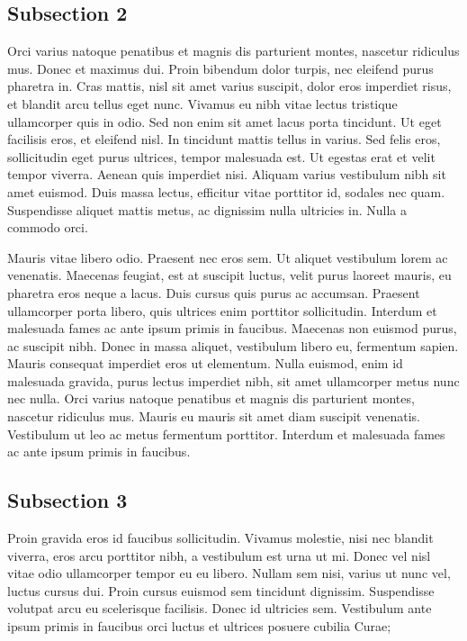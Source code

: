 \subsection{Subsection 2}

Orci varius natoque penatibus et magnis dis parturient montes, nascetur ridiculus mus. Donec et maximus dui. Proin bibendum dolor turpis, nec eleifend purus pharetra in. Cras mattis, nisl sit amet varius suscipit, dolor eros imperdiet risus, et blandit arcu tellus eget nunc. Vivamus eu nibh vitae lectus tristique ullamcorper quis in odio. Sed non enim sit amet lacus porta tincidunt. Ut eget facilisis eros, et eleifend nisl. In tincidunt mattis tellus in varius. Sed felis eros, sollicitudin eget purus ultrices, tempor malesuada est. Ut egestas erat et velit tempor viverra. Aenean quis imperdiet nisi. Aliquam varius vestibulum nibh sit amet euismod. Duis massa lectus, efficitur vitae porttitor id, sodales nec quam. Suspendisse aliquet mattis metus, ac dignissim nulla ultricies in. Nulla a commodo orci.

Mauris vitae libero odio. Praesent nec eros sem. Ut aliquet vestibulum lorem ac venenatis. Maecenas feugiat, est at suscipit luctus, velit purus laoreet mauris, eu pharetra eros neque a lacus. Duis cursus quis purus ac accumsan. Praesent ullamcorper porta libero, quis ultrices enim porttitor sollicitudin. Interdum et malesuada fames ac ante ipsum primis in faucibus. Maecenas non euismod purus, ac suscipit nibh. Donec in massa aliquet, vestibulum libero eu, fermentum sapien. Mauris consequat imperdiet eros ut elementum. Nulla euismod, enim id malesuada gravida, purus lectus imperdiet nibh, sit amet ullamcorper metus nunc nec nulla. Orci varius natoque penatibus et magnis dis parturient montes, nascetur ridiculus mus. Mauris eu mauris sit amet diam suscipit venenatis. Vestibulum ut leo ac metus fermentum porttitor. Interdum et malesuada fames ac ante ipsum primis in faucibus.

\subsection{Subsection 3}

Proin gravida eros id faucibus sollicitudin. Vivamus molestie, nisi nec blandit viverra, eros arcu porttitor nibh, a vestibulum est urna ut mi. Donec vel nisl vitae odio ullamcorper tempor eu eu libero. Nullam sem nisi, varius ut nunc vel, luctus cursus dui. Proin cursus euismod sem tincidunt dignissim. Suspendisse volutpat arcu eu scelerisque facilisis. Donec id ultricies sem. Vestibulum ante ipsum primis in faucibus orci luctus et ultrices posuere cubilia Curae;

